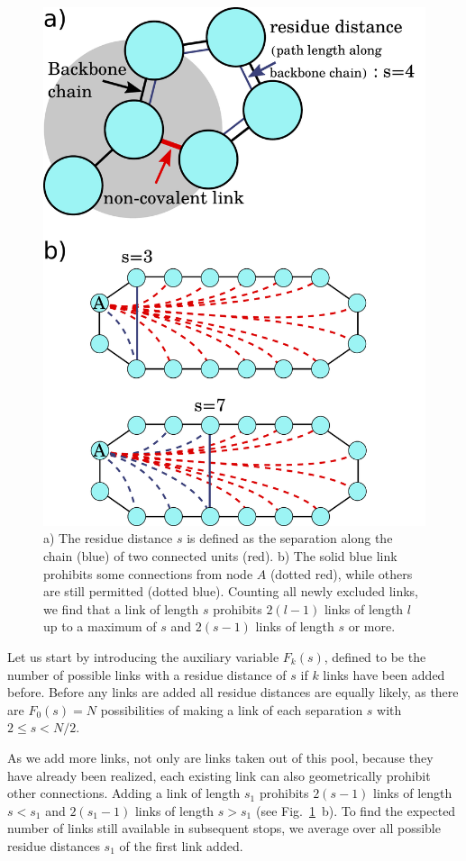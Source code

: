 \documentclass[
reprint,
twocolumn,
amsmath,amssymb,superscriptaddress,aps,
pre]{revtex4-1}
\begin{document}
\begin{figure}[h]
    \centering
    \includegraphics[width=0.7\columnwidth]{figures/Fig1/Fig1.pdf}
    \caption{a) The residue distance $s$ is defined as the separation along the chain (blue) of two connected units (red). b) The solid blue link prohibits some connections from node $A$ (dotted red), while others are still permitted (dotted blue). Counting all newly excluded links, we find that a link of length $s$ prohibits $2(l-1)$ links of length $l$ up to a maximum of $s$ and $2(s-1)$ links of length $s$ or more.}
    \label{fig:schematic}
\end{figure}

Let us start by introducing the auxiliary variable $F_k(s)$, defined to be the number of possible links with a residue distance of $s$ if $k$ links have been added before. Before any links are added all residue distances are equally likely, as there are $F_0(s)=N$ possibilities of making a link of each separation $s$ with $2\leq s < N/2$.

As we add more links, not only are links taken out of this pool, because they have already been realized, each existing link can also geometrically prohibit other connections. Adding a link of length $s_1$ prohibits $2(s-1)$ links of length $s<s_1$ and $2(s_1-1)$ links of length $s>s_1$ (see Fig.~\ref{fig:schematic}~b). To find the expected number of links still available in subsequent stops, we average over all possible residue distances $s_1$ of the first link added.
\end{document}
